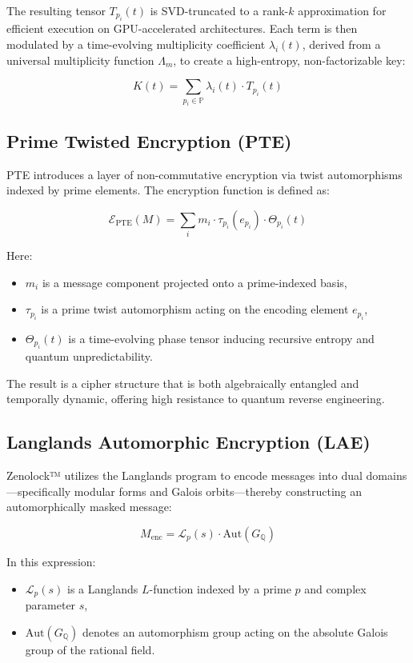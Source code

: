 \documentclass{article}
\theoremstyle{plain}
\begin{document}
The resulting tensor $T_{p_i}(t)$ is SVD-truncated to a rank-$k$ approximation for efficient execution on GPU-accelerated architectures. Each term is then modulated by a time-evolving multiplicity coefficient $\lambda_i(t)$, derived from a universal multiplicity function $\Lambda_m$, to create a high-entropy, non-factorizable key:

\[
K(t) = \sum_{p_i \in \mathbb{P}} \lambda_i(t) \cdot T_{p_i}(t)
\]

\subsection{Prime Twisted Encryption (PTE)}

PTE introduces a layer of non-commutative encryption via twist automorphisms indexed by prime elements. The encryption function is defined as:

\[
\mathcal{E}_{\text{PTE}}(M) = \sum_i m_i \cdot \tau_{p_i}(e_{p_i}) \cdot \Theta_{p_i}(t)
\]

Here:
\begin{itemize}
  \item $m_i$ is a message component projected onto a prime-indexed basis,
  \item $\tau_{p_i}$ is a prime twist automorphism acting on the encoding element $e_{p_i}$,
  \item $\Theta_{p_i}(t)$ is a time-evolving phase tensor inducing recursive entropy and quantum unpredictability.
\end{itemize}

The result is a cipher structure that is both algebraically entangled and temporally dynamic, offering high resistance to quantum reverse engineering.

\subsection{Langlands Automorphic Encryption (LAE)}

Zenolock™ utilizes the Langlands program to encode messages into dual domains—specifically modular forms and Galois orbits—thereby constructing an automorphically masked message:

\[
M_{\text{enc}} = \mathcal{L}_p(s) \cdot \text{Aut}(G_{\mathbb{Q}})
\]

In this expression:
\begin{itemize}
  \item $\mathcal{L}_p(s)$ is a Langlands $L$-function indexed by a prime $p$ and complex parameter $s$,
  \item $\text{Aut}(G_{\mathbb{Q}})$ denotes an automorphism group acting on the absolute Galois group of the rational field.
\end{itemize}
\end{document}
